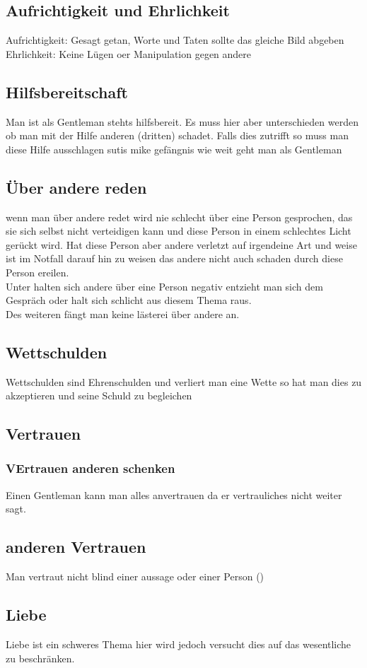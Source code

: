         \subsection{Aufrichtigkeit und Ehrlichkeit}
            Aufrichtigkeit: Gesagt getan, Worte und Taten sollte das gleiche Bild abgeben
            Ehrlichkeit: Keine Lügen oer Manipulation gegen andere 
        \subsection{Hilfsbereitschaft}
            Man ist als Gentleman stehts hilfsbereit. Es muss hier aber unterschieden werden ob man mit der Hilfe anderen (dritten) schadet. Falls dies zutrifft so muss man diese Hilfe ausschlagen {\color{red}sutis mike gefängnis}
            wie weit geht man als Gentleman 
        \subsection{Über andere reden}
            wenn man über andere redet wird nie schlecht über eine Person gesprochen, das sie sich selbst nicht verteidigen kann und diese Person in einem schlechtes Licht gerückt wird. Hat diese Person aber andere verletzt auf irgendeine Art und weise ist im Notfall darauf hin zu weisen das andere nicht auch schaden durch diese Person ereilen. \\
            Unter halten sich andere über eine Person negativ entzieht man sich dem Gespräch oder halt sich schlicht aus diesem Thema raus. \\
            Des weiteren fängt man keine lästerei über andere an. 
        \subsection{Wettschulden}  
            Wettschulden sind Ehrenschulden und verliert man eine Wette so hat man dies zu akzeptieren und seine Schuld zu begleichen 
        \subsection{Vertrauen}
            \subsubsection{VErtrauen anderen schenken}
                Einen Gentleman kann man alles anvertrauen da er vertrauliches nicht weiter sagt.
            \subsection{anderen Vertrauen}  
                Man vertraut nicht blind einer aussage oder einer Person ()
        \subsection{Liebe}
            Liebe ist ein schweres Thema hier wird jedoch versucht dies auf das wesentliche zu beschränken. 
        
            
    
